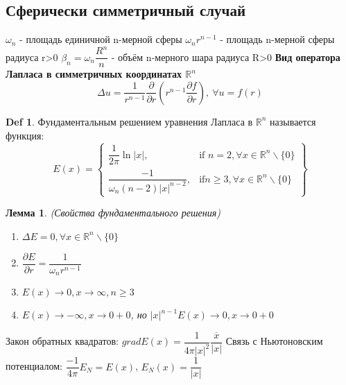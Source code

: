 \documentclass[14pt]{article}
\theoremstyle{plain}
\newtheorem{Lem}{Лемма}
\theoremstyle{definition}
\newtheorem{Def}{Def}
\begin{document}
		\subsection{Сферически симметричный случай}
			$\omega_n$ - площадь единичной n-мерной сферы\newline
			$\omega_n r^{n-1}$ - площадь n-мерной сферы радиуса r>0\newline
			$\beta_n = \omega_n\dfrac{R^n}{n}$ - объём n-мерного шара радиуса R>0\newline
			\textbf{Вид оператора Лапласа в симметричных координатах $\mathbb{R}^n$}
			$$\Delta u = \dfrac{1}{r^{n-1}} \dfrac{\partial}{\partial r} \left( r^{n-1} \dfrac{\partial f}{\partial r}\right), \ \forall u = f(r)$$
			\begin{Def}
				Фундаментальным решением уравнения Лапласа в $\mathbb{R}^n$ называется функция:
				\begin{equation*}
				E(x) = 
				\left\{
				\begin{array}{lr}
					\dfrac{1}{2\pi} \ln{|x|}, & \text{if } n = 2, \forall x \in \mathbb{R}^n \backslash \{0\}\\
					\dfrac{-1}{\omega_n (n-2) |x|^{n-2}}, & \text{if} n \geq 3 , \forall x \in \mathbb{R}^n \backslash \{0\}
				\end{array}
				\right\}
			\end{equation*}
			\end{Def}
			\begin{Lem}
				(Свойства фундаментального решения) \newline
				\begin{enumerate}
					\item  $\Delta E = 0, \forall x \in \mathbb{R}^n \backslash \{0\}$
					\item $\dfrac{\partial E}{\partial r} = \dfrac{1}{\omega_n r^{n-1}}$
					\item $E(x) \to 0, x \to \infty, n \geq 3$
					\item $E(x) \to -\infty, x \to 0+0$, но $ |x|^{n-1} E(x) \to 0, x\to 0+0$
				\end{enumerate}		
			\end{Lem}		
			Закон обратных квадратов: $grad E(x) = \dfrac{1}{4\pi |x|^2} \dfrac{\overline{x}}{|x|}$ \newline
			Связь с Ньютоновским потенциалом: $ \dfrac{-1}{4\pi}E_N = E(x)$, $E_N(x) = \dfrac{1}{|x|}$
\end{document}
